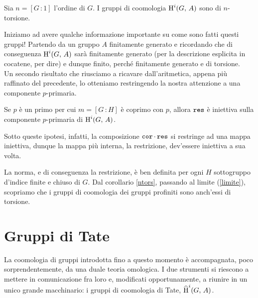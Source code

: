\begin{corollary}\label{ntors}
	Sia $ n = [G 	\,\colon 1] $ l'ordine di $ G $. I gruppi di coomologia $ \operatorname{H}^i(G, \, A) $ sono di $ n $-torsione.
\end{corollary}

Iniziamo ad avere qualche informazione importante su come sono fatti questi gruppi! Partendo da un gruppo $ A $ finitamente generato e ricordando che di conseguenza $ \operatorname{H}^i(G, \, A) $ sarà finitamente generato (per la descrizione esplicita in cocatene, per dire) e dunque finito, perché finitamente generato e di torsione. \\

Un secondo risultato che riusciamo a ricavare dall'aritmetica, appena più raffinato del precedente, lo otteniamo restringendo la nostra attenzione a una componente $ p $-primaria.

\begin{lemma}\label{injp}
	Se $ p $ è un primo per cui $ m = [G \, \colon H] $ è coprimo con $ p $, allora $ \operatorname{\mathtt{res}} $ è iniettiva sulla componente $ p $-primaria di $ \operatorname{H}^i(G, \, A) $.
\end{lemma}

Sotto queste ipotesi, infatti, la composizione $ \operatorname{\mathtt{cor}} \cdot \operatorname{\mathtt{res}} $ si restringe ad una mappa iniettiva, dunque la mappa più interna, la restrizione, dev'essere iniettiva a sua volta.

\begin{profinite}
	La norma, e di conseguenza la restrizione, è ben definita per ogni $ H $ sottogruppo d'indice finite e chiuso di $ G $. Dal corollario \ref{ntors}, passando al limite (\ref{limite}), scopriamo che i gruppi di coomologia dei gruppi profiniti sono anch'essi di torsione.
\end{profinite}

\section{Gruppi di Tate}
La coomologia di gruppi introdotta fino a questo momento è accompagnata, poco sorprendentemente, da una duale teoria omologica. I due strumenti si riescono a mettere in comunicazione fra loro e, modificati opportunamente, a riunire in un unico grande macchinario: i gruppi di coomologia di Tate, $ \operatorname{\widehat{H}}^i(G, \, A) $. \\


